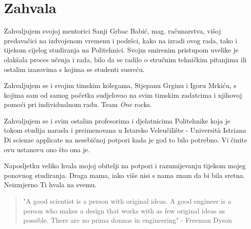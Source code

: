 \chapter*{Zahvala}
Zahvaljujem svojoj mentorici Sanji Grbac Babić, mag. računarstva, višoj predavačici na izdvojenom vremenu i podršci, kako na izradi ovog rada, tako i tijekom cijelog studiranja na Politehnici.
Svojm smirenim pristupom uvelike je olakšala proces učenja i rada, bilo da se radilo o stručnim tehničkim pitanjima ili ostalim izazovima s kojima se studenti susreću.

Zahvaljujem se i svojim timskim kolegama, Stjepanu Grginu i Igoru Mrkiću, s kojima sam od samog početka sudjelovao na svim timskim zadatcima i njihovoj pomoći pri individualnom radu. 
Team \textit{One} rocks.

Zahvaljujem se i svim ostalim profesorima i djelatnicima Politehnike koja je tokom studija narasla i preimenovana u Istarsko Veleučilište - Universit\`{a} Istriana Di scienze applicate na nesebičnoj potpori kada je god to bilo potrebno.
Vi činite ovu ustanovu ono što ona je.

Naposljetku veliko hvala mojoj obitelji na potpori i razumijevanju tijekom mojeg ponovnog studiranja.
Draga mama, iako više nisi s nama znam da bi bila sretna.
Neizmjerno Ti hvala na svemu.

\vspace*{2cm}

\begin{quotation}
"A good scientist is a person with original ideas. A good engineer is a person who makes a design that works with as few original ideas as possible. There are no prima donnas in engineering" - Freeman Dyson
\end{quotation}
